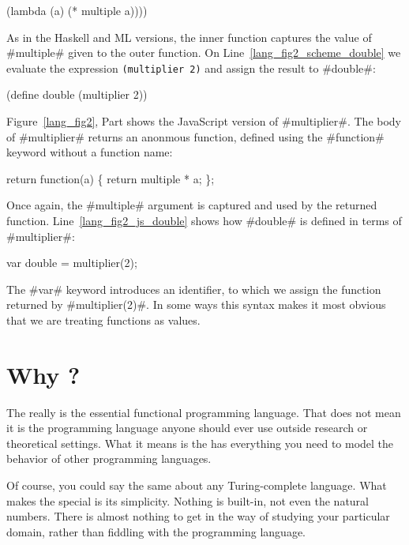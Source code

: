 \documentclass[12pt]{report}
\begin{document}
\begin{AVerb}
  (lambda (a) (* multiple a))))
\end{AVerb}

As in the Haskell and ML versions, the inner function captures the
value of #multiple# given to the outer function. On
Line~\ref{lang_fig2_scheme_double} we evaluate the expression
\texttt{({multiplier} 2)} and assign the result to #double#:
\begin{AVerb}
  (define double 
    (multiplier 2))
\end{AVerb}

Figure~\ref{lang_fig2}, Part  shows the JavaScript
version of #multiplier#. The body of #multiplier# returns an anonmous
function, defined using the #function# keyword without a function name:
\begin{AVerb}
  return function(a) \{ 
    return multiple * a;
  \};
\end{AVerb}

Once again, the #multiple# argument is captured and used by the
returned function. Line~\ref{lang_fig2_js_double} shows how #double#
is defined in terms of #multiplier#:

\begin{AVerb}
  var double = multiplier(2);
\end{AVerb}

The #var# keyword introduces an
identifier, to which we assign the function returned by
#multiplier(2)#. In some ways this syntax makes it most obvious that
we are treating functions as values.


\section{Why \LamA?}
\label{lang_sec1_}

The \lamA really is the essential functional programming language.  
That does not mean it is the programming language anyone
should ever use outside research or theoretical settings. What it
means is the \lamA has everything you need to model the behavior
of other programming languages. 

Of course, you could say the same about any Turing-complete
language. What makes the \lamA special is its simplicity. Nothing is
built-in, not even the natural numbers. There is almost nothing to get
in the way of studying your particular domain, rather than fiddling
with the programming language.
\end{document}
